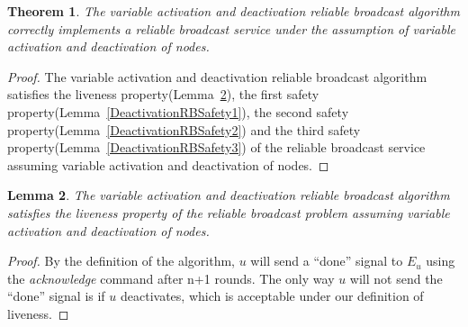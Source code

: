 \documentclass[english]{article}
\newtheorem{theorem}{Theorem}[section]
\newtheorem{lemma}[theorem]{Lemma}
\begin{document}
\begin{theorem}
\label{DeactivationReliableBroadcast}
The variable activation and deactivation reliable broadcast algorithm correctly implements a reliable broadcast service under the assumption of variable activation and deactivation of nodes.
\end{theorem}
\begin{proof}
The variable activation and deactivation reliable broadcast algorithm satisfies the liveness property(Lemma~\ref{DeactivationRBLiveness}), 
the first safety property(Lemma~\ref{DeactivationRBSafety1}),
the second safety property(Lemma~\ref{DeactivationRBSafety2}) and 
the third safety property(Lemma~\ref{DeactivationRBSafety3}) of the reliable broadcast service assuming variable activation and deactivation of nodes.
\end{proof}

\begin{lemma}
\label{DeactivationRBLiveness}
The variable activation and deactivation reliable broadcast algorithm satisfies the liveness property of the reliable broadcast problem assuming variable activation and deactivation of nodes.
\end{lemma}
\begin{proof}

By the definition of the algorithm, $u$ will send  a ``done'' signal to $E_u$ using the \textit{acknowledge} command after n+1 rounds. The only way $u$ will not send the ``done'' signal is if $u$ deactivates, which is acceptable under our definition of liveness.
\end{proof}
\end{document}
